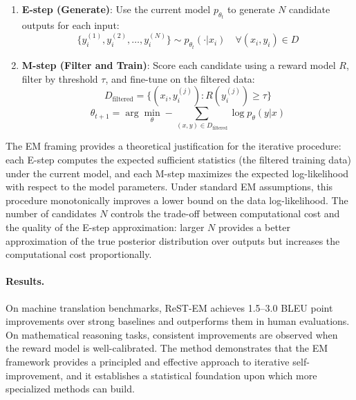 \begin{enumerate}
    \item \textbf{E-step (Generate)}: Use the current model $p_{\theta_t}$ to generate $N$ candidate outputs for each input:
    \begin{equation}
        \{y_i^{(1)}, y_i^{(2)}, \ldots, y_i^{(N)}\} \sim p_{\theta_t}(\cdot | x_i) \quad \forall (x_i, y_i) \in D
        \label{eq:rest-estep}
    \end{equation}
    \item \textbf{M-step (Filter and Train)}: Score each candidate using a reward model $R$, filter by threshold $\tau$, and fine-tune on the filtered data:
    \begin{equation}
        D_{\text{filtered}} = \{(x_i, y_i^{(j)}) : R(y_i^{(j)}) \geq \tau\}
        \label{eq:rest-mstep}
    \end{equation}
    \begin{equation}
        \theta_{t+1} = \arg\min_\theta -\sum_{(x, y) \in D_{\text{filtered}}} \log p_\theta(y | x)
        \label{eq:rest-update}
    \end{equation}
\end{enumerate}

The EM framing provides a theoretical justification for the iterative procedure: each E-step computes the expected sufficient statistics (the filtered training data) under the current model, and each M-step maximizes the expected log-likelihood with respect to the model parameters. Under standard EM assumptions, this procedure monotonically improves a lower bound on the data log-likelihood. The number of candidates $N$ controls the trade-off between computational cost and the quality of the E-step approximation: larger $N$ provides a better approximation of the true posterior distribution over outputs but increases the computational cost proportionally.

\paragraph{Results.}
On machine translation benchmarks, ReST-EM achieves 1.5--3.0 BLEU point improvements over strong baselines and outperforms them in human evaluations. On mathematical reasoning tasks, consistent improvements are observed when the reward model is well-calibrated. The method demonstrates that the EM framework provides a principled and effective approach to iterative self-improvement, and it establishes a statistical foundation upon which more specialized methods can build.

